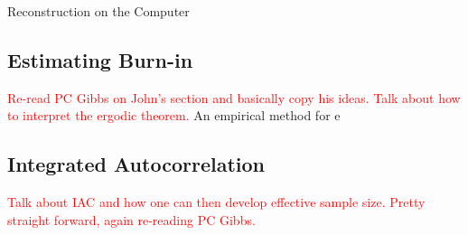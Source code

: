 \begin{chapter}{Reconstruction on the Computer}
  \subsection{Estimating Burn-in}
  \textcolor{red}{
  Re-read PC Gibbs on John's section and basically copy his ideas.
  Talk about how to interpret the ergodic theorem.
  }
  An empirical method for e
  \subsection{Integrated Autocorrelation}
  \textcolor{red}{
  Talk about IAC and how one can then develop effective sample size.  
  Pretty straight forward, again re-reading PC Gibbs.  
}

\end{chapter}
